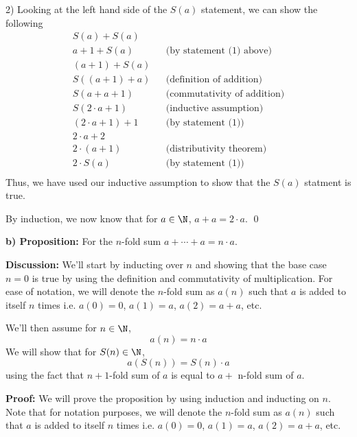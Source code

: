 \begin{paragraph}{2)}
        Looking at the left hand side of the $S(a)$ statement, we can show the following
        \begin{align*}
            S(a) + S(a) \\
            a + 1 + S(a) && \text{(by statement (1) above)} \\
            (a + 1) + S(a) \\
            S((a + 1) + a) && \text{(definition of addition)} \\
            S(a + a + 1) && \text{(commutativity of addition)} \\
            S(2 \cdot a + 1) && \text{(inductive assumption)} \\
            (2 \cdot a + 1) + 1 && \text{(by statement (1))} \\
            2\cdot a + 2 \\
            2 \cdot (a + 1) && \text{(distributivity theorem)} \\
            2 \cdot S(a) && \text{(by statement (1))} \\
        \end{align*}
        Thus, we have used our inductive assumption to show that the $S(a)$ statment is true.
        \spacing
        
        By induction, we now know that for $a \in \N$, $a + a = 2 \cdot a$. \qed
        \bigskip

        \textbf{b) Proposition:} For the $n$-fold sum $a + \cdots + a = n \cdot a$.
        \spacing

        \textbf{Discussion:} We'll start by inducting over $n$ and showing that 
        the base case $n = 0$ is true by using the definition and commutativity of multiplication.
        For ease of notation, we will denote the $n$-fold sum as $a(n)$ such that $a$ is 
        added to itself $n$ times i.e. $a(0) = 0$, $a(1) = a$, $a(2) = a + a$, etc.
        \spacing

        We'll then assume for $n \in \N$,
        $$a(n) = n \cdot a$$
        We will show that for $S(n) \in \N$,
        $$a(S(n)) = S(n) \cdot a$$
        using the fact that $n + 1$-fold sum of $a$ is equal to $a + $ n-fold sum of $a$.
        \spacing

        \textbf{Proof:} We will prove the proposition by using induction and inducting on $n$.
        Note that for notation purposes, we will denote the $n$-fold sum as $a(n)$ such that $a$ is 
        added to itself $n$ times i.e. $a(0) = 0$, $a(1) = a$, $a(2) = a + a$, etc.
        \spacing


\end{paragraph}
